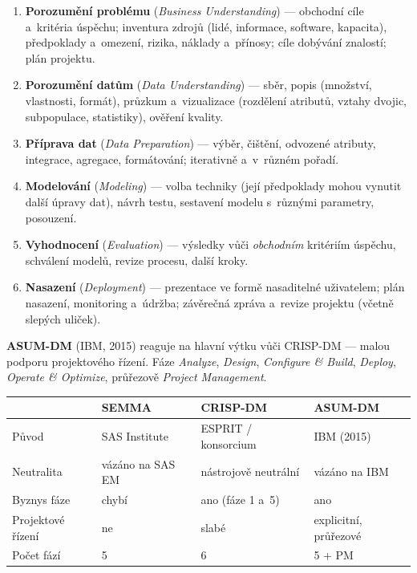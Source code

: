 \documentclass[11pt,a4paper]{article}
\theoremstyle{definition}
\begin{document}
\begin{enumerate}
\item \textbf{Porozumění problému} (\emph{Business Understanding}) --- obchodní cíle a~kritéria
      úspěchu; inventura zdrojů (lidé, informace, software, kapacita), předpoklady a~omezení,
      rizika, náklady a~přínosy; cíle dobývání znalostí; plán projektu.
\item \textbf{Porozumění datům} (\emph{Data Understanding}) --- sběr, popis (množství,
      vlastnosti, formát), průzkum a~vizualizace (rozdělení atributů, vztahy dvojic,
      subpopulace, statistiky), ověření kvality.
\item \textbf{Příprava dat} (\emph{Data Preparation}) --- výběr, čištění, odvozené atributy,
      integrace, agregace, formátování; iterativně a~v~různém pořadí.
\item \textbf{Modelování} (\emph{Modeling}) --- volba techniky (její předpoklady mohou vynutit
      další úpravy dat), návrh testu, sestavení modelu s~různými parametry, posouzení.
\item \textbf{Vyhodnocení} (\emph{Evaluation}) --- výsledky vůči \emph{obchodním} kritériím
      úspěchu, schválení modelů, revize procesu, další kroky.
\item \textbf{Nasazení} (\emph{Deployment}) --- prezentace ve formě nasaditelné uživatelem;
      plán nasazení, monitoring a~údržba; závěrečná zpráva a~revize projektu (včetně slepých
      uliček).
\end{enumerate}

\textbf{ASUM-DM} (IBM, 2015) reaguje na hlavní výtku vůči CRISP-DM --- malou podporu
projektového řízení. Fáze \emph{Analyze}, \emph{Design}, \emph{Configure \& Build},
\emph{Deploy}, \emph{Operate \& Optimize}, průřezově \emph{Project Management}.

\begin{center}
\small
\begin{tabular}{@{}llll@{}}
\toprule
& \textbf{SEMMA} & \textbf{CRISP-DM} & \textbf{ASUM-DM} \\
\midrule
Původ & SAS Institute & ESPRIT / konsorcium & IBM (2015) \\
Neutralita & vázáno na SAS EM & nástrojově neutrální & vázáno na IBM \\
Byznys fáze & chybí & ano (fáze 1 a~5) & ano \\
Projektové řízení & ne & slabé & explicitní, průřezové \\
Počet fází & 5 & 6 & 5 + PM \\
\bottomrule
\end{tabular}
\end{center}
\end{document}
